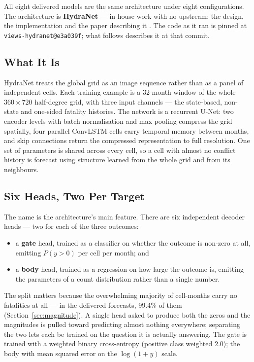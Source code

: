 All eight delivered models are the same architecture under eight configurations. The architecture
is \textbf{HydraNet} --- in-house work with no upstream: the design, the implementation and the
paper describing it \citep{maase_hydranet}. The code as it ran is pinned at
\texttt{views-hydranet@e3a039f}; what follows describes it at that commit.

\subsection*{What It Is}

HydraNet treats the global grid as an image sequence rather than as a panel of independent cells.
Each training example is a 32-month window of the whole $360 \times 720$ half-degree grid, with
three input channels --- the state-based, non-state and one-sided fatality histories. The network
is a recurrent U-Net: two encoder levels with batch normalisation and max pooling compress the
grid spatially, four parallel ConvLSTM cells carry temporal memory between months, and skip
connections return the compressed representation to full resolution. One set of parameters is
shared across every cell, so a cell with almost no conflict history is forecast using structure
learned from the whole grid and from its neighbours.

\subsection*{Six Heads, Two Per Target}

The name is the architecture's main feature. There are six independent decoder heads --- two for
each of the three outcomes:

\begin{itemize}
    \item a \textbf{gate} head, trained as a classifier on whether the outcome is non-zero at all,
          emitting $P(y > 0)$ per cell per month; and
    \item a \textbf{body} head, trained as a regression on how large the outcome is, emitting the
          parameters of a count distribution rather than a single number.
\end{itemize}

\noindent The split matters because the overwhelming majority of cell-months carry no fatalities at
all --- in the delivered forecasts, 99.4\% of them (Section~\ref{sec:magnitude}). A single head
asked to produce both the zeros and the magnitudes is pulled toward predicting almost nothing
everywhere; separating the two lets each be trained on the question it is actually answering. The
gate is trained with a weighted binary cross-entropy (positive class weighted $2.0$); the body
with mean squared error on the $\log(1+y)$ scale.

